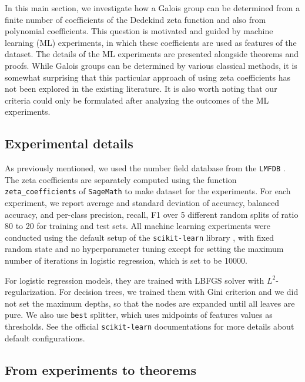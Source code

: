 \documentclass[letterpaper, 10pt]{article}
\newcommand{\1}{\mathds{1}}	%
\theoremstyle{definition}
\theoremstyle{remark}
\begin{document}
In this main section, we investigate how a Galois group can be determined from a finite number of coefficients of the Dedekind zeta function and also from polynomial coefficients. This question is motivated and guided by machine learning (ML) experiments, in which these coefficients are used as features of the dataset. The details of the ML experiments are presented alongside theorems and proofs. While Galois groups can be determined by various classical methods, it is somewhat surprising that this particular approach of using zeta coefficients has not been explored in the existing literature. It is also worth noting that our criteria could only be formulated after analyzing the outcomes of the ML experiments.


\subsection{Experimental details}

As previously mentioned, we used the number field database from the \texttt{LMFDB} \cite{lmfdb}.
 The zeta coefficients are separately computed using the function \texttt{zeta\_coefficients} of \texttt{SageMath} \cite{sagemath} to make dataset for the experiments.
For each experiment, we report average and standard deviation of accuracy, balanced accuracy, and per-class precision, recall, F1 over 5 different random splits of ratio 80 to 20 for training and test sets.
All machine learning experiments were conducted using the  default setup of the \texttt{scikit-learn} library \cite{pedregosa2011scikit}, with fixed random state and no hyperparameter tuning except for setting the maximum number of iterations in logistic regression,  which is set to be 10000.

For logistic regression models, they are trained with LBFGS solver with $L^2$-regularization.
For decision trees, we trained them with Gini criterion and we did not set the maximum depths, so that the nodes are expanded until all leaves are pure.
We also use \texttt{best} splitter, which uses midpoints of features values as thresholds.
See the official \texttt{scikit-learn} documentations \cite{sklearn-lr,sklearn-dt} for more details about default configurations.


\subsection{From experiments to theorems}
\label{subsec:pipeline}
\end{document}
